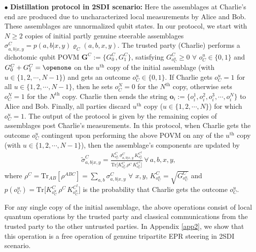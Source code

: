 \documentclass[reprint,superscriptaddress,nofootinbib,amsmath,amssymb,aps,pra,longbibliography]{revtex4-1}
\begin{document}
$\bullet$ {\bf Distillation protocol in 2SDI scenario:}  Here the assemblages at Charlie's end are produced due to uncharacterized local measurements by Alice and Bob. These assemblages are unnormalized qubit states. In our protocol, we start with $N \geq 2$ copies of initial partly genuine steerable assemblages $\sigma_{a,b|x,y}^{C} =p(a,b|x,y)\varrho_{C}(a,b, x,y)$. The trusted party (Charlie) performs a dichotomic qubit POVM  $\textbf{G}^{C}:=\{G_{0}^{C},G_{1}^{C}\}$, satisfying $G_{o^u_C}^{C} \ge 0$ $\forall$ $o^u_C \in \{0,1\}$ and $G_0^{C} + G_1^{C} = \openone$ on the $u^{\text{th}}$ copy of the initial assemblage (with $u \in \{1, 2, \cdots, N-1\}$) and gets an outcome $o^u_C \in \{ 0, 1\}$. If Charlie gets $o^u_C=1$ for all $u \in \{1, 2, \cdots, N-1\}$, then he sets $o^N_C=0$ for the $N^{\text{th}}$ copy, otherwise sets $o^N_C=1$ for the $N^{\text{th}}$ copy. Charlie then sends the string $\textbf{o}_{i}:=\{o^1_i, o^2_i, o^3_i, \cdots, o^{N}_i\}$ to Alice and Bob. Finally, all parties discard $u^{\text{th}}$ copy ($u \in \{1, 2, \cdots, N\}$) for which $o^u_C=1$. The output of the protocol is given by the remaining  copies of assemblages post Charlie's measurements. In this protocol, when Charlie gets the outcome $o^u_C$ contingent upon performing the above POVM on any of the $u^{\text{th}}$ copy (with $u \in \{1, 2, \cdots, N-1\}$), then the assemblage’s components are updated by 
\begin{align}
    \widetilde{\sigma}_{a,b|x,y}^{C} = \frac{ K_{o^u_C}^C \, \sigma_{a,b|x,y}^{C} \, K_{o^u_C}^{C^{\dagger}} }{\text{Tr} \Big[  K_{o^u_C}^C \, \rho^{C} \, K_{o^u_C}^{C^{\dagger}} \Big]} \, \forall \, a,b,x,y,
    \label{finalass3}
\end{align}
where $\rho^{C} = \text{Tr}_{AB}[\rho^{ABC}] = \sum_{a,b} \sigma_{a,b|x,y}^{C}$ $\forall$ $x,y$, $K_{o^u_C}^C = \sqrt{G_{o^u_C}^C}$ and $p(o^u_C) = \text{Tr} \Big[  K_{o^u_C}^C \, \rho^{C} \, K_{o^u_C}^{C^{\dagger}} \Big]$ is the probability that Charlie gets the outcome $o^u_C$.

For any single copy of the initial assemblage, the above operations consist of local quantum operations by  the trusted party and classical communications from  the trusted party to the other untrusted parties. In Appendix \ref{app2}, we show that this operation is a free operation of genuine tripartite EPR steering in 2SDI scenario. %
\end{document}
